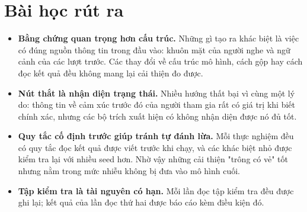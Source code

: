 \section{Bài học rút ra}

\begin{itemize}
	\item \textbf{Bằng chứng quan trọng hơn cấu trúc.} Những gì tạo ra khác biệt là việc có đúng nguồn thông tin trong đầu vào: khuôn mặt của người nghe và ngữ cảnh của các lượt trước. Các thay đổi về cấu trúc mô hình, cách gộp hay cách đọc kết quả đều không mang lại cải thiện đo được.
	\item \textbf{Nút thắt là nhận diện trạng thái.} Nhiều hướng thất bại vì cùng một lý do: thông tin về cảm xúc trước đó của người tham gia rất có giá trị khi biết chính xác, nhưng các bộ trích xuất hiện có không nhận diện được nó đủ tốt.
	\item \textbf{Quy tắc cố định trước giúp tránh tự đánh lừa.} Mỗi thực nghiệm đều có quy tắc đọc kết quả được viết trước khi chạy, và các khác biệt nhỏ được kiểm tra lại với nhiều seed hơn. Nhờ vậy những cải thiện "trông có vẻ" tốt nhưng nằm trong mức nhiễu không bị đưa vào mô hình cuối.
	\item \textbf{Tập kiểm tra là tài nguyên có hạn.} Mỗi lần đọc tập kiểm tra đều được ghi lại; kết quả của lần đọc thứ hai được báo cáo kèm điều kiện đó.
\end{itemize}
